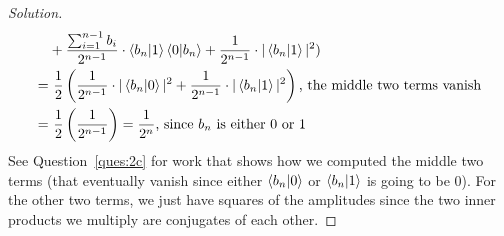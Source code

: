 \begin{solution}[label=ques:2a]
\begin{proof}[Solution]
\begin{equation}
\begin{split}
        &+ \frac{\sum_{i=1}^{n-1}b_i}{2^{n - 1}}\cdot\braket{b_n|1}\braket{0|b_n} + \frac{1}{2^{n - 1}}\cdot|\braket{b_n|1}|^2)\\
        = &\ \frac{1}{2}\left(\frac{1}{2^{n - 1}}\cdot|\braket{b_n|0}|^2 + \frac{1}{2^{n - 1}}\cdot|\braket{b_n|1}|^2\right)\text{, the middle two terms vanish}\\
        = &\ \frac{1}{2}\left(\frac{1}{2^{n - 1}}\right) = \frac{1}{2^n}\text{, since $b_n$ is either $0$ or $1$}
      \end{split}
      \label{eq:hadn1measrho}
    \end{equation}
    See Question~\ref{ques:2c} for work that shows how we computed the middle two terms (that eventually vanish since either $\braket{b_n|0}$ or $\braket{b_n|1}$ is going to be $0$). For the other two terms, we just have squares of the amplitudes since the two inner products we multiply are conjugates of each other.
  \end{proof}
\end{solution}

